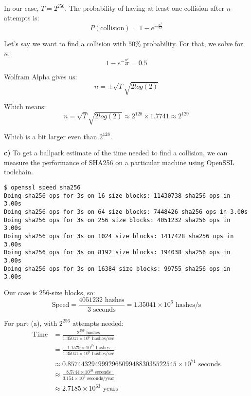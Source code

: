 In our case, $T = 2^{256}$.
The probability of having at least one collision after $n$ attempts is:
\[ P(\text{collision}) = 1 - e^{-\frac{n^2}{2T}} \]

Let's say we want to find a collision with $50\%$ probability.
For that, we solve for $n$:
\begin{equation}
    1 - e^{-\frac{n^2}{2T}} = 0.5
\end{equation}

Wolfram Alpha gives us:
\begin{equation}
    n = \pm \sqrt{T} \sqrt{2 log(2)}
\end{equation}

Which means:
\begin{equation}
    n = \sqrt{T} \sqrt{2 log(2)} \approx 2^{128} \times 1.7741 \approx 2^{129}
\end{equation}

Which is a bit larger even than $2^{128}$.

\textbf{c)} To get a ballpark estimate of the time needed to find a collision, we can measure the performance of SHA256 on a particular machine using OpenSSL toolchain.

\begin{verbatim}
$ openssl speed sha256
Doing sha256 ops for 3s on 16 size blocks: 11430738 sha256 ops in 3.00s
Doing sha256 ops for 3s on 64 size blocks: 7448426 sha256 ops in 3.00s
Doing sha256 ops for 3s on 256 size blocks: 4051232 sha256 ops in 3.00s
Doing sha256 ops for 3s on 1024 size blocks: 1417428 sha256 ops in 3.00s
Doing sha256 ops for 3s on 8192 size blocks: 194038 sha256 ops in 3.00s
Doing sha256 ops for 3s on 16384 size blocks: 99755 sha256 ops in 3.00s
\end{verbatim}

Our case is 256-size blocks, so:
\[ \text{Speed} = \frac{4051232 \text{ hashes}}{3 \text{ seconds}} = 1.35041 \times 10^6 \text{ hashes/s} \]

For part (a), with $2^{256}$ attempts needed:
\begin{align*}
    \text{Time} &= \frac{2^{256} \text{ hashes}}{1.35041 \times 10^6 \text{ hashes/sec}} \\
    &= \frac{1.1579 \times 10^{77} \text{ hashes}}{1.35041 \times 10^6 \text{ hashes/sec}} \\
    &\approx 0.85744329499929650994883035522545 \times 10^{71} \text{ seconds} \\
    &\approx \frac{8.5744 \times 10^{70} \text{ seconds}}{3.154 \times 10^7 \text{ seconds/year}} \\
    &\approx 2.7185 \times 10^{63} \text{ years}
\end{align*}

